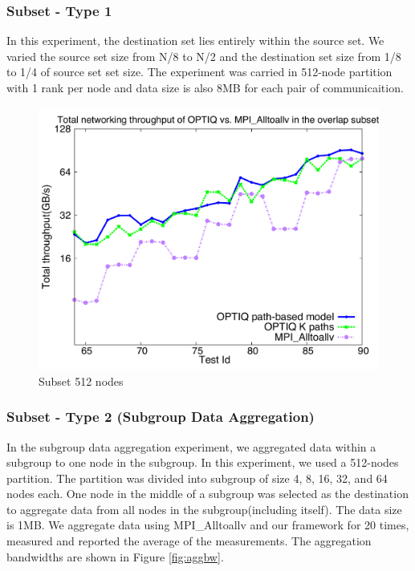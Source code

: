 \subsubsection{Subset - Type 1}

In this experiment, the destination set lies entirely within the source set. We varied the source set size from N/8 to N/2 and the destination set size from 1/8 to 1/4 of source set set size. The experiment was carried in 512-node partition with 1 rank per node and data size is also 8MB for each pair of communicaition.

\begin{figure}[!htb]
\vspace{-0.1in}
\centering
\includegraphics[scale=0.30]{figures/subset_512.pdf}
\vspace{-0.1in}
\caption{Subset 512 nodes}
\vspace{-0.1in}
\label{fig:subset_512}
\end{figure}

\subsubsection{Subset - Type 2 (Subgroup Data Aggregation)}

In the subgroup data aggregation experiment, we aggregated data within a subgroup to one node in the subgroup. In this experiment, we used a 512-nodes partition. The partition was divided into subgroup of size 4, 8, 16, 32, and 64 nodes each. One node in the middle of a subgroup was selected as the destination to aggregate data from all nodes in the subgroup(including itself). The data size is 1MB. We aggregate data using MPI\_Alltoallv and our framework for 20 times, measured and reported the average of the measurements. The aggregation bandwidths are shown in Figure \ref{fig:aggbw}.

